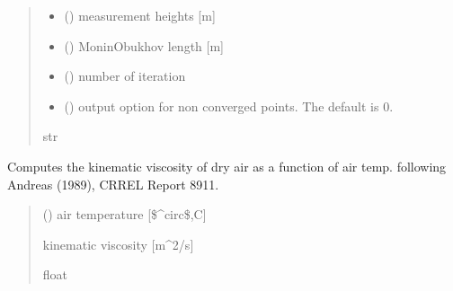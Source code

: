 \documentclass[letterpaper,10pt,english]{sphinxmanual}
\begin{document}
\begin{fulllineitems}
\begin{quote}
\begin{description}
\begin{itemize}
\item {} 
\sphinxAtStartPar
{} () \textendash{} measurement heights           {[}m{]}

\item {} 
\sphinxAtStartPar
{} () \textendash{} Monin\sphinxhyphen{}Obukhov length          {[}m{]}

\item {} 
\sphinxAtStartPar
{} () \textendash{} number of iteration

\item {} 
\sphinxAtStartPar
{} (\sphinxstyleliteralemphasis{\sphinxupquote{, }}) \textendash{} output option for non converged points. The default is 0.

\end{itemize}

\sphinxAtStartPar
{}

\sphinxAtStartPar
str

\end{description}\end{quote}

\end{fulllineitems}


\begin{fulllineitems}
\label{\detokenize{users_guide:AirSeaFluxCode.util_subs.visc_air}}
\pysigstartsignatures
{}
\pysigstopsignatures
\sphinxAtStartPar
Computes the kinematic viscosity of dry air as a function of air temp.
following Andreas (1989), CRREL Report 89\sphinxhyphen{}11.
\begin{quote}\begin{description}
\sphinxAtStartPar
{} () \textendash{} air temperature {[}\$\textasciicircum{}circ\$,C{]}

\sphinxAtStartPar
{} \textendash{} kinematic viscosity {[}m\textasciicircum{}2/s{]}

\sphinxAtStartPar
float

\end{description}\end{quote}

\end{fulllineitems}
\end{document}
